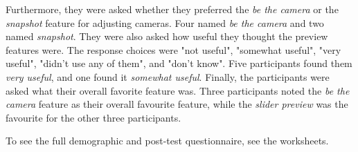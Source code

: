 Furthermore, they were asked whether they preferred the \textit{be the camera} or the \textit{snapshot} feature for adjusting cameras. Four named\textit{ be the camera} and two named \textit{snapshot}. 
They were also asked how useful they thought the preview features were. The response choices were "not useful", "somewhat useful", "very useful", "didn't use any of them", and "don't know". Five participants found them \textit{very useful}, and one found it \textit{somewhat useful}.
Finally, the participants were asked what their overall favorite feature was. Three participants noted the \textit{be the camera} feature as their overall favourite feature, while the \textit{slider preview} was the favourite for the other three participants. 

To see the full demographic and post-test questionnaire, see the worksheets.



